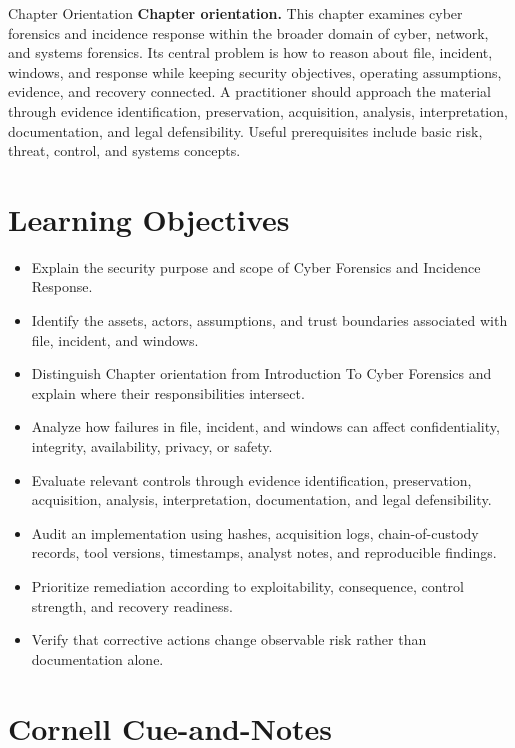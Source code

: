 \documentclass[11pt,letterpaper]{article}
\title{\CornellDocumentTitle}
\author{}
\date{}
\begin{document}
\maketitle
\begin{CornellOverviewBox}{Chapter Orientation}
\textbf{Chapter orientation.} This chapter examines cyber forensics and incidence response within the broader domain of cyber, network, and systems forensics. Its central problem is how to reason about file, incident, windows, and response while keeping security objectives, operating assumptions, evidence, and recovery connected. A practitioner should approach the material through evidence identification, preservation, acquisition, analysis, interpretation, documentation, and legal defensibility. Useful prerequisites include basic risk, threat, control, and systems concepts.
\end{CornellOverviewBox}
\section*{Learning Objectives}
\begin{itemize}
\item Explain the security purpose and scope of Cyber Forensics and Incidence Response.
\item Identify the assets, actors, assumptions, and trust boundaries associated with file, incident, and windows.
\item Distinguish Chapter orientation from Introduction To Cyber Forensics and explain where their responsibilities intersect.
\item Analyze how failures in file, incident, and windows can affect confidentiality, integrity, availability, privacy, or safety.
\item Evaluate relevant controls through evidence identification, preservation, acquisition, analysis, interpretation, documentation, and legal defensibility.
\item Audit an implementation using hashes, acquisition logs, chain-of-custody records, tool versions, timestamps, analyst notes, and reproducible findings.
\item Prioritize remediation according to exploitability, consequence, control strength, and recovery readiness.
\item Verify that corrective actions change observable risk rather than documentation alone.
\end{itemize}
\section*{Cornell Cue-and-Notes}
\end{document}
